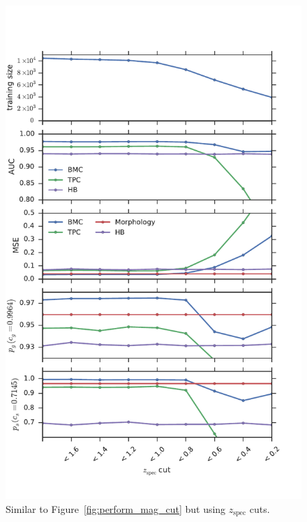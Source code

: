 \documentclass[useAMS,usenatbib]{mn2e}
\begin{document}
\begin{figure}
    \centering
    \includegraphics[width=\columnwidth]{figures/perform_z_cut.pdf}
    \caption{Similar to Figure~\ref{fig:perform_mag_cut}
        but using $z_{\text{spec}}$ cuts.}
    \label{fig:perform_z_cut}
\end{figure}
\end{document}
